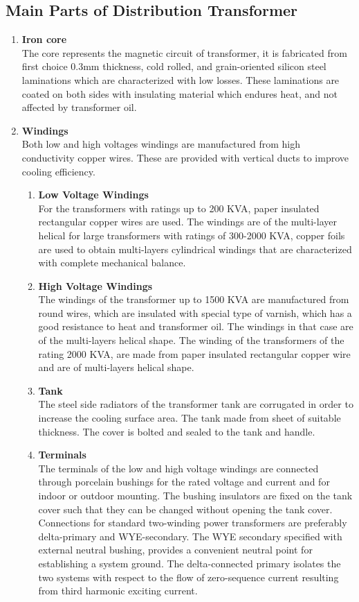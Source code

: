 \documentclass[12pt,fleqn]{book} %
\begin{document}
\subsection{Main Parts of Distribution Transformer}
 \begin{enumerate}
 \item \textbf {Iron core}
 \\ The core represents the magnetic circuit of transformer, it is fabricated from first choice 0.3mm thickness, cold rolled, and grain-oriented silicon steel laminations which are characterized with low losses. These laminations are coated on both sides with insulating material which endures heat, and not affected by transformer oil.
 \item \textbf {Windings}
 \\ Both low and high voltages windings are manufactured from high conductivity copper wires. These are provided with vertical ducts to improve cooling efficiency.
       \begin{enumerate}
       \item \textbf {Low Voltage Windings}
       \\ For the transformers with ratings up to 200 KVA, paper insulated rectangular copper wires are used. The windings are of the multi-layer helical for large transformers with ratings of 300-2000 KVA, copper foils are used to obtain multi-layers cylindrical windings that are characterized with complete mechanical balance.
       \item \textbf {High Voltage Windings}
       \\ The windings of the transformer up to 1500 KVA are manufactured from round wires, which are insulated with special type of varnish, which has a good resistance to heat and transformer oil. The windings in that case are of the multi-layers helical shape. The winding of the transformers of the rating 2000 KVA, are made from paper insulated rectangular copper wire and are of multi-layers helical shape.
       \item \textbf {Tank}
       \\ The steel side radiators of the transformer tank are corrugated in order to increase the cooling surface area. The tank made from sheet of suitable thickness. The cover is bolted and sealed to the tank and handle.
       \item \textbf {Terminals}
       \\ The terminals of the low and high voltage windings are connected through porcelain bushings for the rated voltage and current and for indoor or outdoor mounting. The bushing insulators are fixed on the tank cover such that they can be changed without opening the tank cover. Connections for standard two-winding power transformers are preferably delta-primary and WYE-secondary. The WYE secondary specified with external neutral bushing, provides a convenient neutral point for establishing a system ground. The delta-connected primary isolates the two systems with respect to the flow of zero-sequence current resulting from third harmonic exciting current.

\end{enumerate}
\end{enumerate}
\end{document}
